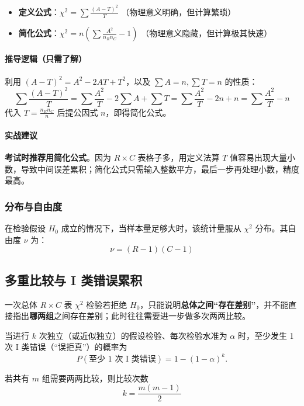\documentclass[lang=cn,10pt]{elegantbook}
\begin{document}
\begin{itemize}
    \item \textbf{定义公式}：$\displaystyle \chi^2 = \sum \frac{(A-T)^2}{T}$ （物理意义明确，但计算繁琐）
    \item \textbf{简化公式}：$\displaystyle \chi^2 = n \left( \sum \frac{A^2}{n_R n_C} - 1 \right)$ （物理意义隐藏，但计算极其快速）
\end{itemize}

\paragraph{推导逻辑（只需了解）}
利用 $(A-T)^2 = A^2 - 2AT + T^2$，以及 $\sum A = n, \sum T = n$ 的性质：
\[
\sum \frac{(A-T)^2}{T} = \sum \frac{A^2}{T} - 2\sum A + \sum T = \sum \frac{A^2}{T} - 2n + n = \sum \frac{A^2}{T} - n
\]
代入 $T = \frac{n_R n_C}{n}$ 后提公因式 $n$，即得简化公式。

\paragraph{实战建议}
\textbf{考试时推荐用简化公式}。因为 $R \times C$ 表格子多，用定义法算 $T$ 值容易出现大量小数，导致中间误差累积；简化公式只需输入整数平方，最后一步再处理小数，精度最高。

\subsubsection{分布与自由度}
在检验假设 $H_0$ 成立的情况下，当样本量足够大时，该统计量服从 $\chi^2$ 分布。其自由度 $\nu$ 为：
\begin{equation}
\nu = (R-1)(C-1)
\end{equation}

\subsection{多重比较与 I 类错误累积}
一次总体 $R\times C$ 表 $\chi^2$ 检验若拒绝 $H_0$，只能说明\textbf{总体之间“存在差别”}，并不能直接指出\textbf{哪两组}之间存在差别；此时往往需要进一步做多次两两比较。

当进行 $k$ 次独立（或近似独立）的假设检验、每次检验水准为 $\alpha$ 时，至少发生 1 次 I 类错误（“误拒真”）的概率为
\begin{equation}
P(\text{至少 1 次 I 类错误})=1-(1-\alpha)^k.
\end{equation}

若共有 $m$ 组需要两两比较，则比较次数 
\begin{equation}
k=\dfrac{m(m-1)}{2}
\end{equation}
\end{document}
